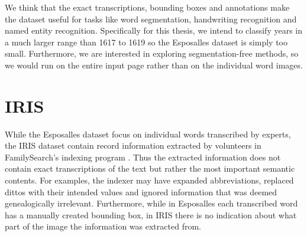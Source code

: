 We think that the exact transcriptions, bounding boxes and annotations make the dataset useful for
tasks like word segmentation, handwriting recognition and named entity recognition.
Specifically for this thesis, we intend to classify years in a much larger range than 1617 to 1619 so the Esposalles dataset is simply too small. Furthermore, we are interested in exploring segmentation-free methods, so we would run on the entire input page rather than on the individual word images.




\section{IRIS}

While the Esposalles dataset focus on individual words transcribed by experts, the IRIS dataset contain record information extracted by volunteers in FamilySearch's indexing program \cite{Iris}.
Thus the extracted information does not contain exact transcriptions of the text but rather the most important semantic contents.
For examples, the indexer may have expanded abbreviations, replaced dittos with their intended values and ignored information that was deemed genealogically irrelevant.
Furthermore, while in Esposalles each transcribed word has a manually created bounding box, in IRIS there is no indication about what part of the image the information was extracted from.

